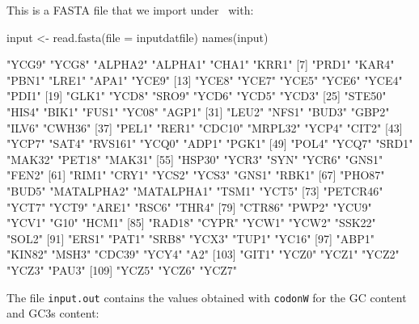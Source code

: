 \documentclass{article}
\begin{document}
This is a FASTA file that we import under \Rlogo{}~with:

\begin{Schunk}
\begin{Sinput}
 input <- read.fasta(file = inputdatfile)
 names(input)
\end{Sinput}
\begin{Soutput}
  [1] "YCG9"      "YCG8"      "ALPHA2"    "ALPHA1"    "CHA1"      "KRR1"     
  [7] "PRD1"      "KAR4"      "PBN1"      "LRE1"      "APA1"      "YCE9"     
 [13] "YCE8"      "YCE7"      "YCE5"      "YCE6"      "YCE4"      "PDI1"     
 [19] "GLK1"      "YCD8"      "SRO9"      "YCD6"      "YCD5"      "YCD3"     
 [25] "STE50"     "HIS4"      "BIK1"      "FUS1"      "YC08"      "AGP1"     
 [31] "LEU2"      "NFS1"      "BUD3"      "GBP2"      "ILV6"      "CWH36"    
 [37] "PEL1"      "RER1"      "CDC10"     "MRPL32"    "YCP4"      "CIT2"     
 [43] "YCP7"      "SAT4"      "RVS161"    "YCQ0"      "ADP1"      "PGK1"     
 [49] "POL4"      "YCQ7"      "SRD1"      "MAK32"     "PET18"     "MAK31"    
 [55] "HSP30"     "YCR3"      "SYN"       "YCR6"      "GNS1"      "FEN2"     
 [61] "RIM1"      "CRY1"      "YCS2"      "YCS3"      "GNS1"      "RBK1"     
 [67] "PHO87"     "BUD5"      "MATALPHA2" "MATALPHA1" "TSM1"      "YCT5"     
 [73] "PETCR46"   "YCT7"      "YCT9"      "ARE1"      "RSC6"      "THR4"     
 [79] "CTR86"     "PWP2"      "YCU9"      "YCV1"      "G10"       "HCM1"     
 [85] "RAD18"     "CYPR"      "YCW1"      "YCW2"      "SSK22"     "SOL2"     
 [91] "ERS1"      "PAT1"      "SRB8"      "YCX3"      "TUP1"      "YC16"     
 [97] "ABP1"      "KIN82"     "MSH3"      "CDC39"     "YCY4"      "A2"       
[103] "GIT1"      "YCZ0"      "YCZ1"      "YCZ2"      "YCZ3"      "PAU3"     
[109] "YCZ5"      "YCZ6"      "YCZ7"     
\end{Soutput}
\end{Schunk}

The file \texttt{input.out} contains the values obtained with \texttt{codonW}
for the GC content and GC3s content:
\end{document}
